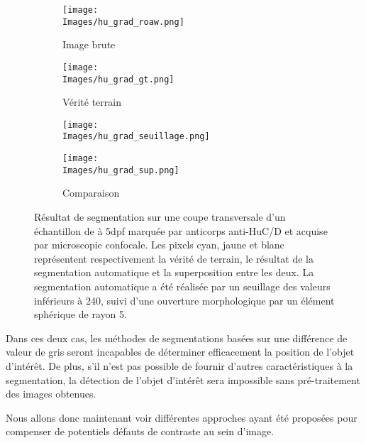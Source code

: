 \documentclass[\main/main.tex]{subfiles}
\begin{document}
\begin{figure}[h]
\begin{center}
    \begin{subfigure}[b]{0.2245\textwidth}
        \caption{
        Image brute
            }
       \centering \texttt{[image: \\Images/hu\_grad\_roaw.png]}
    \end{subfigure}
    \begin{subfigure}[b]{0.2245\textwidth}
        \caption{
        Vérité terrain
            }
       \centering \texttt{[image: \\Images/hu\_grad\_gt.png]}
    \end{subfigure}
    \begin{subfigure}[b]{0.2245\textwidth}
        \caption{
            }
       \centering \texttt{[image: \\Images/hu\_grad\_seuillage.png]}
    \end{subfigure}
    \begin{subfigure}[b]{0.2245\textwidth}
        \caption{
            Comparaison
            }
       \centering \texttt{[image: \\Images/hu\_grad\_sup.png]}
    \end{subfigure}
    \caption{
    \label{apriori:grad}
        Résultat de segmentation sur une coupe transversale d'un échantillon de \pz à 5dpf marquée par anticorps anti\hyp{}HuC/D et acquise par microscopie confocale.
        Les pixels cyan, jaune et blanc représentent respectivement la vérité de terrain,
        le résultat de la segmentation automatique et la superposition entre les deux.
        La segmentation automatique a été réalisée par un seuillage des valeurs inférieurs à 240, suivi d'une ouverture morphologique par un élément sphérique de rayon 5.
    }
\end{center}
\end{figure}

Dans ces deux cas, les méthodes de segmentations basées sur une différence de valeur de gris seront incapables de déterminer efficacement la position de l'objet d'intérêt.
%
De plus, s'il n'est pas possible de fournir d'autres caractéristiques à la segmentation, la détection de l'objet d'intérêt sera impossible sans pré\hyp{}traitement des images obtenues.

%
Nous allons donc maintenant voir différentes approches ayant été proposées pour compenser de potentiels défauts de contraste au sein d'image.
\end{document}
